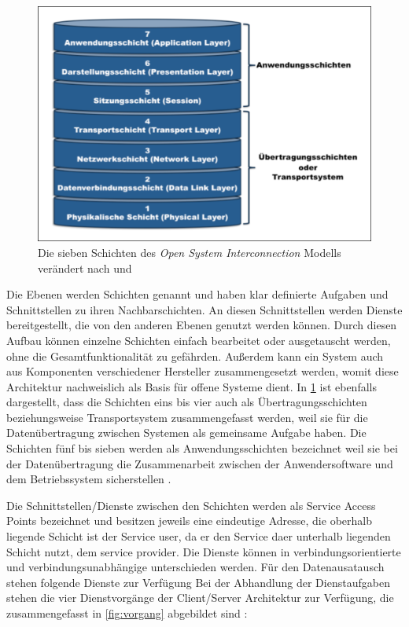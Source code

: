 \begin{figure}
\centering
\includegraphics[width=\textwidth]{abbildungen/20160112_osi}
\caption[Die sieben Schichten des Open System Interconnection Modells]{Die sieben Schichten des \textit{Open System Interconnection} Modells verändert nach \cite[S.~10]{schn06} und \cite[S.~28]{osi96}}
\label{fig:osi}
\end{figure}

Die Ebenen werden Schichten genannt und haben klar definierte Aufgaben und Schnittstellen zu ihren Nachbarschichten. An diesen Schnittstellen werden Dienste bereitgestellt, die von den anderen Ebenen genutzt werden können. Durch diesen Aufbau können einzelne Schichten einfach bearbeitet oder ausgetauscht werden, ohne die Gesamtfunktionalität zu gefährden. Außerdem kann ein System auch aus Komponenten verschiedener Hersteller zusammengesetzt werden, womit diese Architektur nachweislich als Basis für offene Systeme dient. In \ref{fig:osi} ist ebenfalls dargestellt, dass die Schichten eins bis vier auch als Übertragungsschichten beziehungsweise Transportsystem zusammengefasst werden, weil sie für die Datenübertragung zwischen Systemen als gemeinsame Aufgabe haben. Die Schichten fünf bis sieben werden als Anwendungsschichten bezeichnet weil sie bei der Datenübertragung die Zusammenarbeit zwischen der Anwendersoftware und dem Betriebssystem sicherstellen \cite[S.~8f.]{schn06}.

Die Schnittstellen/Dienste zwischen den Schichten werden als Service Access Points bezeichnet und besitzen jeweils eine eindeutige Adresse, die oberhalb liegende Schicht ist der Service user, da er den Service daer unterhalb liegenden Schicht nutzt, dem service provider. Die Dienste können in verbindungsorientierte und verbindungsunabhängige unterschieden werden.
Für den Datenausatausch stehen folgende Dienste zur Verfügung
Bei der Abhandlung der Dienstaufgaben stehen die vier Dienstvorgänge der Client/Server Architektur zur Verfügung, die zusammengefasst in \ref{fig:vorgang} abgebildet sind \cite[S.~2f.]{mod06tcp} :

